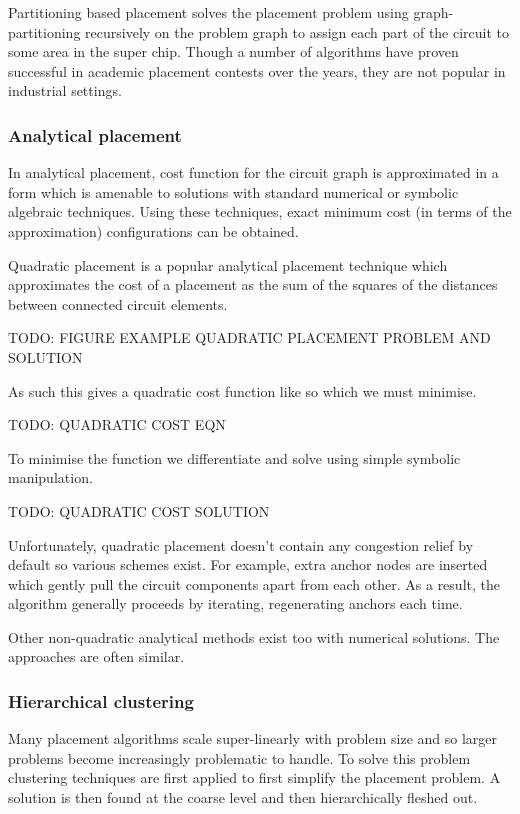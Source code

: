 				Partitioning based placement solves the placement problem using
				graph-partitioning recursively on the problem graph to assign each part
				of the circuit to some area in the super chip. Though a number of
				algorithms have proven successful in academic placement contests over
				the years, they are not popular in industrial settings.
			
			\subsubsection{Analytical placement}
				
				In analytical placement, cost function for the circuit graph is
				approximated in a form which is amenable to solutions with standard
				numerical or symbolic algebraic techniques. Using these techniques,
				exact minimum cost (in terms of the approximation) configurations can
				be obtained.
				
				Quadratic placement is a popular analytical placement technique which
				approximates the cost of a placement as the sum of the squares of the
				distances between connected circuit elements.
				
				TODO: FIGURE EXAMPLE QUADRATIC PLACEMENT PROBLEM AND SOLUTION
				
				As such this gives a quadratic cost function like so which we must
				minimise.
				
				TODO: QUADRATIC COST EQN
				
				To minimise the function we differentiate and solve using simple
				symbolic manipulation.
				
				TODO: QUADRATIC COST SOLUTION
				
				Unfortunately, quadratic placement doesn't contain any congestion
				relief by default so various schemes exist. For example, extra anchor
				nodes are inserted which gently pull the circuit components apart from
				each other. As a result, the algorithm generally proceeds by iterating,
				regenerating anchors each time.
				
				Other non-quadratic analytical methods exist too with numerical
				solutions. The approaches are often similar.
			
			\subsubsection{Hierarchical clustering}
				
				Many placement algorithms scale super-linearly with problem size and so
				larger problems become increasingly problematic to handle. To solve
				this problem clustering techniques are first applied to first simplify
				the placement problem. A solution is then found at the coarse level and
				then hierarchically fleshed out.
				
